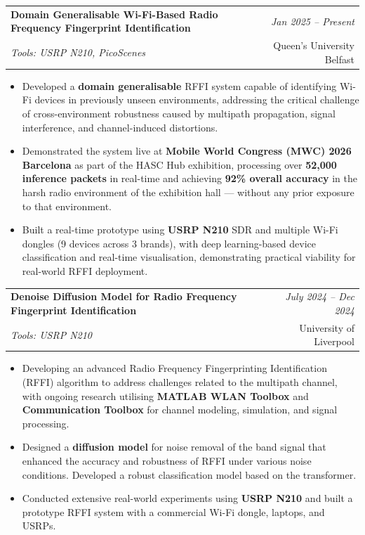 \documentclass[a4paper,11pt]{article}
\makeatletter
\newcommand{\resumeProject}[4]{
\vspace{0.5mm}\item
    \begin{tabular*}{0.98\textwidth}[t]{l@{\extracolsep{\fill}}r}
        \textbf{#1} & \textit{\footnotesize{#3}} \\
        \footnotesize{\textit{#2}} & \footnotesize{#4}
    \end{tabular*}
    \vspace{-2.4mm}
}
\newcommand{\resumeItemListStart}{\begin{itemize}[leftmargin=*,labelsep=1mm,itemsep=0.5mm]}
\newcommand{\resumeItemListEnd}{\end{itemize}\vspace{-2mm}}
\makeatother
\begin{document}
\resumeProject
  {Domain Generalisable Wi-Fi-Based Radio Frequency Fingerprint Identification}
  {Tools: USRP N210, PicoScenes}
  {Jan 2025 -- Present}
  {Queen's University Belfast}
\resumeItemListStart
    \item Developed a \textbf{domain generalisable} RFFI system capable of identifying Wi-Fi devices in previously unseen environments, addressing the critical challenge of cross-environment robustness caused by multipath propagation, signal interference, and channel-induced distortions.
    \item Demonstrated the system live at \textbf{Mobile World Congress (MWC) 2026 Barcelona} as part of the HASC Hub exhibition, processing over \textbf{52,000 inference packets} in real-time and achieving \textbf{92\% overall accuracy} in the harsh radio environment of the exhibition hall --- without any prior exposure to that environment.
    \item Built a real-time prototype using \textbf{USRP N210} SDR and multiple Wi-Fi dongles (9 devices across 3 brands), with deep learning-based device classification and real-time visualisation, demonstrating practical viability for real-world RFFI deployment.
\resumeItemListEnd

\resumeProject
  {Denoise Diffusion Model for Radio Frequency Fingerprint Identification}
  {Tools: USRP N210}
  {July 2024 -- Dec 2024}
  {University of Liverpool}

\resumeItemListStart
    \item Developing an advanced Radio Frequency Fingerprinting Identification (RFFI) algorithm to address challenges related to the multipath channel, with ongoing research utilising \textbf{MATLAB WLAN Toolbox} and \textbf{Communication Toolbox} for channel modeling, simulation, and signal processing.
    \item Designed a \textbf{diffusion model} for noise removal of the band signal that enhanced the accuracy and robustness of RFFI under various noise conditions. Developed a robust classification model based on the transformer.
    \item Conducted extensive real-world experiments using \textbf{USRP N210} and built a prototype RFFI system with a commercial Wi-Fi dongle, laptops, and USRPs.
\resumeItemListEnd
\end{document}
